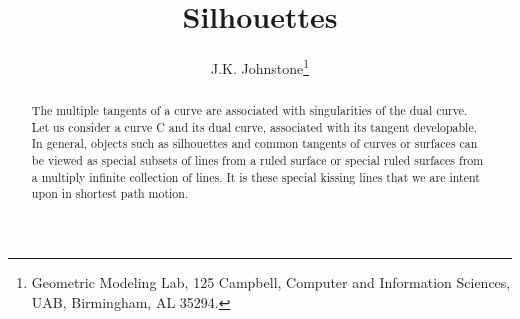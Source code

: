 \documentclass[11pt]{article}
\title{Silhouettes}
\author{J.K. Johnstone\thanks{Geometric Modeling Lab, 125 Campbell, 
	Computer and Information Sciences, UAB, Birmingham, AL 35294.}}
\begin{document}
\maketitle

\begin{abstract}
The multiple tangents of a curve are associated with singularities of the dual curve.
Let us consider a curve C and its dual curve, associated with its tangent
developable.
In general, objects such as silhouettes and common tangents of curves or surfaces
can be viewed as special subsets of lines from a ruled surface or
special ruled surfaces from a multiply infinite collection of lines.
It is these special kissing lines that we are intent upon in shortest path
motion.
\end{abstract}
\end{document}
